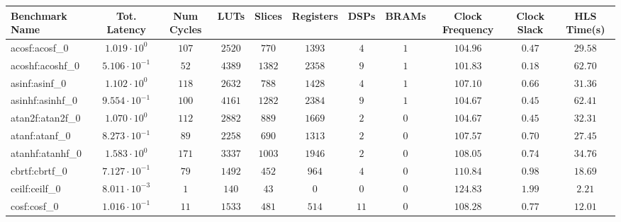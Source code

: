 \begin{tabular}{|l|c|c|c|c|c|c|c|c|c|c|}
\hline
Benchmark Name               & Tot. Latency            & Num Cycles & LUTs      & Slices    & Registers & DSPs    & BRAMs & Clock Frequency & Clock Slack & HLS Time(s) \\
\hline
acosf:acosf\_0               & $ 1.019 \cdot 10^{0}  $ & $ 107    $ & $ 2520  $ & $ 770   $ & $ 1393  $ & $ 4   $ & $ 1 $ & $ 104.96      $ & $ 0.47    $ & $ 29.58   $ \\
acoshf:acoshf\_0             & $ 5.106 \cdot 10^{-1} $ & $ 52     $ & $ 4389  $ & $ 1382  $ & $ 2358  $ & $ 9   $ & $ 1 $ & $ 101.83      $ & $ 0.18    $ & $ 62.70   $ \\
asinf:asinf\_0               & $ 1.102 \cdot 10^{0}  $ & $ 118    $ & $ 2632  $ & $ 788   $ & $ 1428  $ & $ 4   $ & $ 1 $ & $ 107.10      $ & $ 0.66    $ & $ 31.36   $ \\
asinhf:asinhf\_0             & $ 9.554 \cdot 10^{-1} $ & $ 100    $ & $ 4161  $ & $ 1282  $ & $ 2384  $ & $ 9   $ & $ 1 $ & $ 104.67      $ & $ 0.45    $ & $ 62.41   $ \\
atan2f:atan2f\_0             & $ 1.070 \cdot 10^{0}  $ & $ 112    $ & $ 2882  $ & $ 889   $ & $ 1669  $ & $ 2   $ & $ 0 $ & $ 104.67      $ & $ 0.45    $ & $ 32.31   $ \\
atanf:atanf\_0               & $ 8.273 \cdot 10^{-1} $ & $ 89     $ & $ 2258  $ & $ 690   $ & $ 1313  $ & $ 2   $ & $ 0 $ & $ 107.57      $ & $ 0.70    $ & $ 27.45   $ \\
atanhf:atanhf\_0             & $ 1.583 \cdot 10^{0}  $ & $ 171    $ & $ 3337  $ & $ 1003  $ & $ 1946  $ & $ 2   $ & $ 0 $ & $ 108.05      $ & $ 0.74    $ & $ 34.76   $ \\
cbrtf:cbrtf\_0               & $ 7.127 \cdot 10^{-1} $ & $ 79     $ & $ 1492  $ & $ 452   $ & $ 964   $ & $ 4   $ & $ 0 $ & $ 110.84      $ & $ 0.98    $ & $ 18.69   $ \\
ceilf:ceilf\_0               & $ 8.011 \cdot 10^{-3} $ & $ 1      $ & $ 140   $ & $ 43    $ & $ 0     $ & $ 0   $ & $ 0 $ & $ 124.83      $ & $ 1.99    $ & $ 2.21    $ \\
cosf:cosf\_0                 & $ 1.016 \cdot 10^{-1} $ & $ 11     $ & $ 1533  $ & $ 481   $ & $ 514   $ & $ 11  $ & $ 0 $ & $ 108.28      $ & $ 0.77    $ & $ 12.01   $ \\

\end{tabular}
